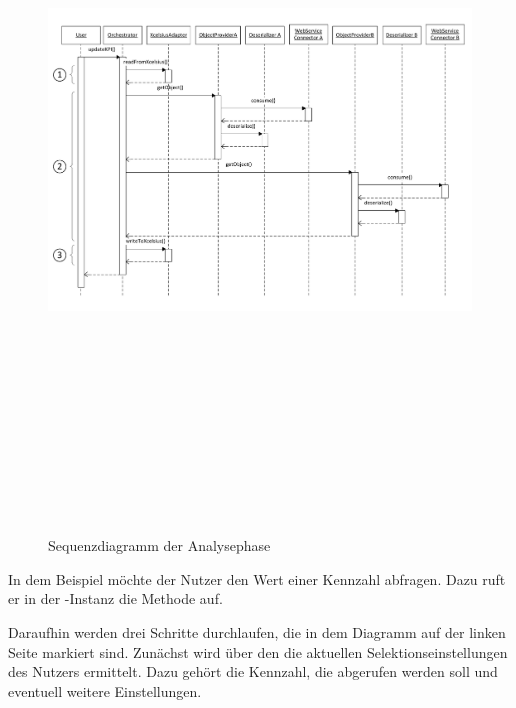 \begin{onehalfspacing}
\begin{figure}[!ht]
\setlength{\unitlength}{1mm}
\includegraphics[angle=90,height=197mm]{Visio/Analyse-Sequenz-1.pdf}
\caption{Sequenzdiagramm der Analysephase \label{fig:sequenz_analyse}}
\end{figure} 

In dem Beispiel möchte der Nutzer den Wert einer Kennzahl abfragen. Dazu ruft er in der -Instanz die Methode  auf.

Daraufhin werden drei Schritte durchlaufen, die in dem Diagramm auf der linken Seite markiert sind. Zunächst wird über den  die aktuellen Selektionseinstellungen des Nutzers ermittelt. Dazu gehört die Kennzahl, die abgerufen werden soll und eventuell weitere Einstellungen.


\end{onehalfspacing}
